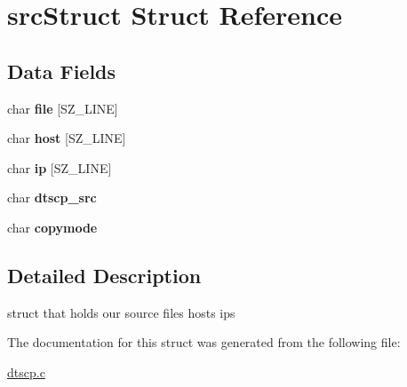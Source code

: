 \hypertarget{structsrcStruct}{
\section{srcStruct Struct Reference}
\label{structsrcStruct}
}
\subsection*{Data Fields}
\begin{CompactItemize}
\item 
\hypertarget{structsrcStruct_103399a1fc7ac7aa5526a87a2b7b3fef}{
char \textbf{file} \mbox{[}SZ\_\-LINE\mbox{]}}
\label{structsrcStruct_103399a1fc7ac7aa5526a87a2b7b3fef}

\item 
\hypertarget{structsrcStruct_dcbce1a9275268a45b4439aac88d83de}{
char \textbf{host} \mbox{[}SZ\_\-LINE\mbox{]}}
\label{structsrcStruct_dcbce1a9275268a45b4439aac88d83de}

\item 
\hypertarget{structsrcStruct_61ecdc05d403b14a51d594f194c8bdb6}{
char \textbf{ip} \mbox{[}SZ\_\-LINE\mbox{]}}
\label{structsrcStruct_61ecdc05d403b14a51d594f194c8bdb6}

\item 
\hypertarget{structsrcStruct_4458be22c4c4ab78f8a910e30612df8f}{
char \textbf{dtscp\_\-src}}
\label{structsrcStruct_4458be22c4c4ab78f8a910e30612df8f}

\item 
\hypertarget{structsrcStruct_2c75e62b4164cfdea97ec8ee1da67e1a}{
char \textbf{copymode}}
\label{structsrcStruct_2c75e62b4164cfdea97ec8ee1da67e1a}

\end{CompactItemize}


\subsection{Detailed Description}
struct that holds our source files hosts ips 

The documentation for this struct was generated from the following file:\begin{CompactItemize}
\item 
\hyperlink{dtscp_8c}{dtscp.c}\end{CompactItemize}
